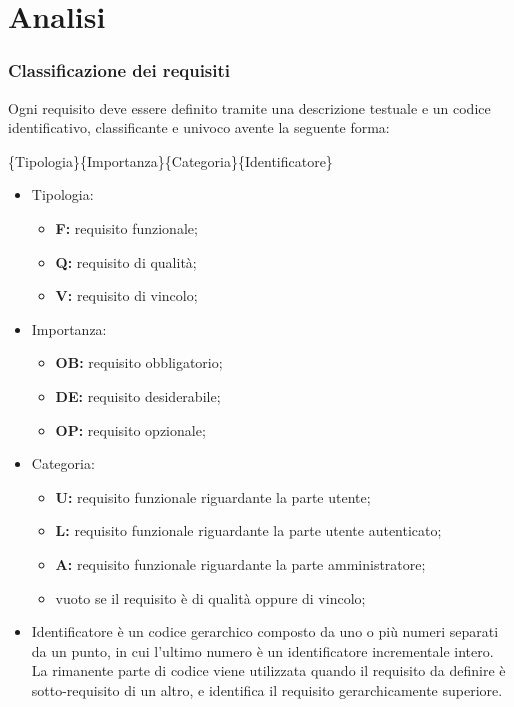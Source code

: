 \section{Analisi}
\subsubsection{Classificazione dei requisiti}
Ogni requisito deve essere definito tramite  una descrizione testuale e un codice identificativo, classificante e univoco avente la seguente forma:

\begin{center}\{Tipologia\}\{Importanza\}\{Categoria\}\{Identificatore\}\end{center}


\begin{itemize}

\item Tipologia:
\begin{itemize}
\item \textbf{F:} requisito funzionale;
\item \textbf{Q:} requisito di qualità;
\item \textbf{V:} requisito di vincolo;
\end{itemize}

\item Importanza:
\begin{itemize}
\item \textbf{OB:} requisito obbligatorio;
\item \textbf{DE:} requisito desiderabile;
\item \textbf{OP:} requisito opzionale;
\end{itemize}


\item Categoria:
\begin{itemize}
\item \textbf{U:} requisito funzionale riguardante la parte utente;
\item \textbf{L:} requisito funzionale riguardante la parte utente autenticato;
\item \textbf{A:} requisito funzionale riguardante la parte amministratore;
\item vuoto se il requisito è di qualità oppure di vincolo;
\end{itemize}


\item Identificatore è un codice gerarchico composto da uno o più numeri separati da un punto, in cui l'ultimo numero è un identificatore incrementale intero.\\
La rimanente parte di codice viene utilizzata quando il requisito da definire è sotto-requisito di un altro, e identifica il requisito gerarchicamente superiore.

\end{itemize}

